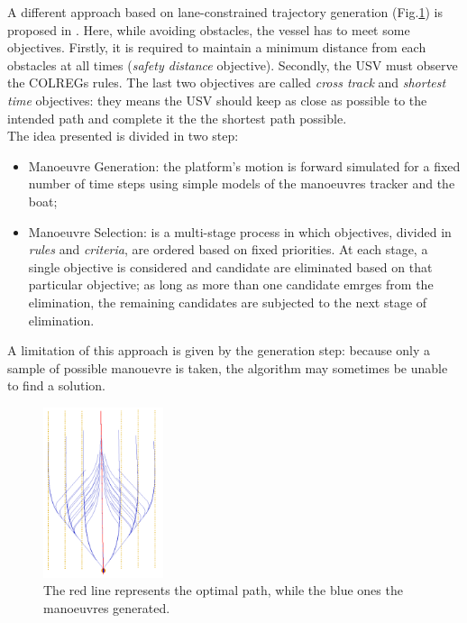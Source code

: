 \documentclass[12pt]{article}
\begin{document}
              A different approach based on lane-constrained trajectory generation (Fig.\ref{fig:lane}) is proposed in \parencite{Tan2010}. Here, while avoiding obstacles, the vessel has to meet some objectives. Firstly, it is required to maintain a minimum distance from each obstacles at all times (\textit{safety distance} objective). Secondly, the USV must observe the COLREGs rules. The last two objectives are called \textit{cross track} and \textit{shortest time} objectives: they means the USV should keep as close as possible to the intended path and complete it the the shortest path possible.\\
              The idea presented is divided in two step:
                    \begin{itemize}
                          \item Manoeuvre Generation: the platform's motion is forward simulated for a fixed number of time steps using simple models of the manoeuvres tracker and the boat;
                          \item Manoeuvre Selection: is a multi-stage process in which objectives, divided in \textit{rules} and \textit{criteria}, are ordered based on fixed priorities. At each stage, a single objective is considered and candidate are eliminated based on that particular objective; as long as more than one candidate emrges from the elimination, the remaining candidates are subjected to the next stage of elimination.
                    \end{itemize}
              A limitation of this approach is given by the generation step: because only a sample of possible manouevre is taken, the algorithm may sometimes be unable to find a solution.

              \begin{figure}
                    \centering
                    \includegraphics[height=5cm]{./Images/Tan/lane}
                    \caption{The red line represents the optimal path, while the blue ones the manoeuvres generated.}
                    \label{fig:lane}
              \end{figure}
\end{document}
